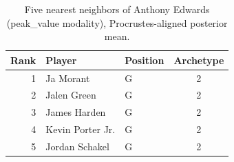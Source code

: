 \begin{table}[htbp]
  \centering\small
  \begin{tabular}{rllc}
    \toprule
    Rank & Player & Position & Archetype \\
    \midrule
    1 & Ja Morant & G & 2 \\
    2 & Jalen Green & G & 2 \\
    3 & James Harden & G & 2 \\
    4 & Kevin Porter Jr. & G & 2 \\
    5 & Jordan Schakel & G & 2 \\
    \bottomrule
  \end{tabular}
  \caption{Five nearest neighbors of Anthony Edwards (peak_value modality), Procrustes-aligned posterior mean.}
  \label{tab:Anthony_Edwards_neighbors_peak_value}
\end{table}

